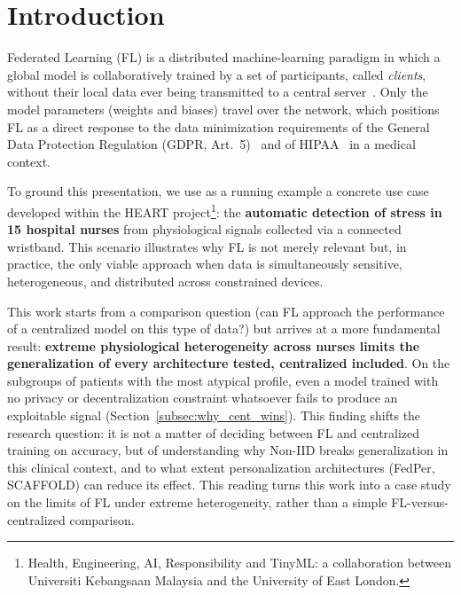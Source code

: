 \documentclass{article}
\begin{document}

\maketitle

\section{Introduction}

Federated Learning (FL) is a distributed machine-learning paradigm in which a global
model is collaboratively trained by a set of participants, called \textit{clients},
without their local data ever being transmitted to a central
server~\cite{mcmahan2017communication}. Only the model parameters (weights and
biases) travel over the network, which positions FL as a direct response to the data
minimization requirements of the General Data Protection Regulation (GDPR,
Art.~5)~\cite{gdpr2016} and of HIPAA~\cite{hipaa1996} in a medical context.

To ground this presentation, we use as a running example a concrete use case
developed within the HEART project\footnote{Health, Engineering, AI, Responsibility
and TinyML: a collaboration between Universiti Kebangsaan Malaysia and the
University of East London.}: the \textbf{automatic detection of stress in 15
hospital nurses} from physiological signals collected via a connected wristband.
This scenario illustrates why FL is not merely relevant but, in practice, the only
viable approach when data is simultaneously sensitive, heterogeneous, and
distributed across constrained devices.

This work starts from a comparison question (can FL approach the performance of a
centralized model on this type of data?) but arrives at a more fundamental result:
\textbf{extreme physiological heterogeneity across nurses limits the generalization
of every architecture tested, centralized included}. On the subgroups of patients
with the most atypical profile, even a model trained with no privacy or
decentralization constraint whatsoever fails to produce an exploitable signal
(Section~\ref{subsec:why_cent_wins}). This finding shifts the research question: it
is not a matter of deciding between FL and centralized training on accuracy, but of
understanding why Non-IID breaks generalization in this clinical context, and to
what extent personalization architectures (FedPer, SCAFFOLD) can reduce its effect.
This reading turns this work into a case study on the limits of FL under extreme
heterogeneity, rather than a simple FL-versus-centralized comparison.
\end{document}
